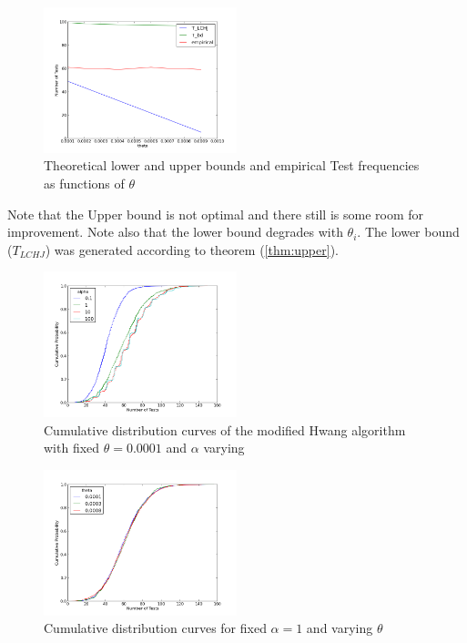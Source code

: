 \documentclass[conference]{IEEEtran}
\begin{document}
\begin{figure}[h]
\centering
\includegraphics[width=0.5\textwidth]{ubvslb.png}
\caption{Theoretical lower and upper bounds and empirical Test frequencies as functions of \(\theta\)}
\label{ubvslb}
\end{figure}

Note that the Upper bound is not optimal and there still is some room for improvement. Note also that the lower bound degrades with \(\theta_i \). The lower bound (\(T_{LCHJ}\)) was generated according to theorem (\ref{thm:upper}). 

\begin{figure}[h]
\centering
\includegraphics[width=0.5\textwidth]{variousalpha.png}
\caption{Cumulative distribution curves of the modified Hwang algorithm with fixed \(\theta = 0.0001\) and \(\alpha\) varying }
\label{testsvsalpha}
\end{figure}

\begin{figure}[h]
\centering
\includegraphics[width=0.5\textwidth]{nicegraphlaminar.png}
\caption{Cumulative distribution curves for fixed \(\alpha = 1\) and varying \(\theta\)}
\label{testsvstheta}
\end{figure}
\end{document}
